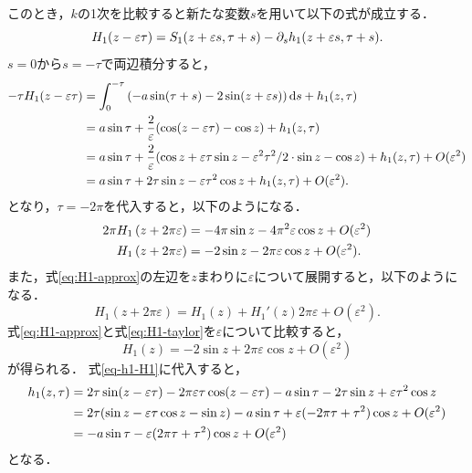 \documentclass[../main]{subfiles}
\begin{document}
    このとき，$k$の1次を比較すると新たな変数$s$を用いて以下の式が成立する．
    \begin{equation}
        H_1(z-\varepsilon \tau)=S_1(z+\varepsilon s,\tau+s)-\partial_s h_1(z+\varepsilon s,\tau+s).
    \end{equation}
    $s=0$から$s=-\tau$で両辺積分すると，
    \begin{align}
        -\tau H_1(z-\varepsilon \tau)&=\int_0^{-\tau}\left(-a\sin(\tau+s)-2\sin(z+\varepsilon s)\right)\dd{s}+h_1(z,\tau)\notag \\
        &=a \sin\tau+\frac{2}{\varepsilon}(\cos (z-\varepsilon \tau)-\cos  z)+h_1(z,\tau)\notag\\
        &=a \sin\tau+\frac{2}{\varepsilon}(\cos z+\varepsilon \tau\sin z-\varepsilon^2\tau^2/2\cdot\sin z-\cos z)+h_1(z,\tau)+O(\varepsilon^2)\notag\\
        &=a \sin\tau+2\tau\sin z-\varepsilon \tau^2\cos z+h_1(z,\tau)+O(\varepsilon^2).
        \label{eq-h1-H1}
    \end{align}
    となり，$\tau=-2\pi$を代入すると，以下のようになる．
    \begin{align}
        2\pi H_1\left(z+ 2\pi\varepsilon\right)&=-4\pi\sin z-4\pi^2\varepsilon \cos z+O(\varepsilon^2)\notag\\
        H_1\left(z+ 2\pi\varepsilon\right)&=-2 \sin z-2\pi\varepsilon \cos z+O(\varepsilon^2).\label{eq:H1-approx}
    \end{align}
    また，式\eqref{eq:H1-approx}の左辺を$z$まわりに$\varepsilon$について展開すると，以下のようになる．
    \begin{equation}
        H_1\left(z+2\pi\varepsilon\right)=H_1(z)+H_1'(z) 2\pi\varepsilon+O(\varepsilon^2).
        \label{eq:H1-taylor}
    \end{equation}
    式\eqref{eq:H1-approx}と式\eqref{eq:H1-taylor}を$\varepsilon$について比較すると，
    \begin{equation}
        \label{eq:nit-H1}
        H_1(z)=-2\sin z+2\pi\varepsilon \cos z+O(\varepsilon^2)
    \end{equation}
    が得られる．
    式\eqref{eq-h1-H1}に代入すると，
    \begin{align}
        h_1(z,\tau)&=2\tau\sin(z-\varepsilon \tau)-2\pi\varepsilon \tau\cos(z-\varepsilon \tau)-a\sin\tau-2\tau\sin z+\varepsilon \tau^2\cos z\notag\\
        &=2\tau(\sin z-\varepsilon \tau\cos z-\sin z)-a\sin\tau+\varepsilon(-2\pi \tau+\tau^2)\cos z+O(\varepsilon^2)\notag\\
        &=-a\sin\tau-\varepsilon(2\pi \tau+\tau^2)\cos z+O(\varepsilon^2)
    \end{align}
    となる．
\end{document}
